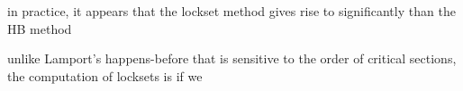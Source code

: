 \documentclass[landscape, a4paper]{article}
\begin{document}
\begin{minipage}[t]{0.19\linewidth}
\begin{betterlist}
		\item {}
		\begin{betterlist}
			\item in practice, it appears that the lockset method gives rise to significantly  than the HB method
			\item unlike Lamport’s happens-before that is sensitive to the order of critical sections, the computation of locksets is  if we 
		\end{betterlist}
  \end{betterlist}
  


\end{minipage}
\end{document}

